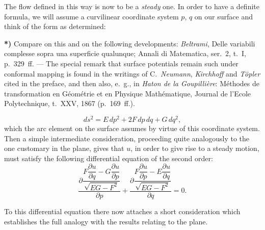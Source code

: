 \documentclass{article}
\begin{document}
The flow defined in this way is now to be a \emph{steady} one. In order to have a definite formula, we will assume a curvilinear coordinate system $p$, $q$ on our surface and think of the form as determined:

\textbf{*)} Compare on this and on the following developments: \emph{Beltrami}, Delle variabili complesse sopra una superficie qualunque; Annali di Matematica, ser.~2, t.~I, p.~329~ff. --- The special remark that surface potentials remain such under conformal mapping is found in the writings of C.\ \emph{Neumann}, \emph{Kirchhoff} and \emph{Töpler} cited in the preface, and then also, e.\ g., in \emph{Haton de la Goupillière}: Méthodes de transformation en Géométrie et en Physique Mathématique, Journal de l'Ecole Polytechnique, t.~XXV, 1867 (p.~169~ff.).

\[ ds^{2} = E\,dp^{2} + 2F\,dp\,dq + G\,dq^{2}, \tag{1} \]
which the arc element on the surface assumes by virtue of this coordinate system. Then a simple intermediate consideration, proceeding quite analogously to the one customary in the plane, gives that $u$, in order to give rise to a steady motion, must satisfy the following differential equation of the second order:
\[ \frac{\partial \dfrac{F\dfrac{\partial u}{\partial q} - G\dfrac{\partial u}{\partial p}}{\sqrt{EG - F^{2}}}}{\partial p} + \frac{\partial \dfrac{F\dfrac{\partial u}{\partial p} - E\dfrac{\partial u}{\partial q}}{\sqrt{EG - F^{2}}}}{\partial q} = 0. \tag{2} \]

To this differential equation there now attaches a short consideration which establishes the full analogy with the results relating to the plane.
\end{document}
